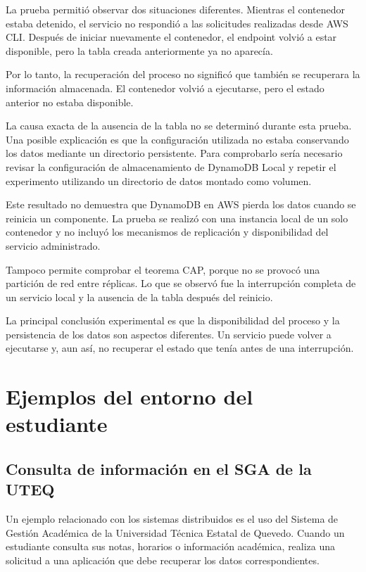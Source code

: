 \documentclass[12pt,a4paper]{article}
\begin{document}
La prueba permitió observar dos situaciones diferentes. Mientras el contenedor estaba detenido, el servicio no respondió a las solicitudes realizadas desde AWS CLI. Después de iniciar nuevamente el contenedor, el endpoint volvió a estar disponible, pero la tabla creada anteriormente ya no aparecía.

Por lo tanto, la recuperación del proceso no significó que también se recuperara la información almacenada. El contenedor volvió a ejecutarse, pero el estado anterior no estaba disponible.

La causa exacta de la ausencia de la tabla no se determinó durante esta prueba. Una posible explicación es que la configuración utilizada no estaba conservando los datos mediante un directorio persistente. Para comprobarlo sería necesario revisar la configuración de almacenamiento de DynamoDB Local y repetir el experimento utilizando un directorio de datos montado como volumen.

Este resultado no demuestra que DynamoDB en AWS pierda los datos cuando se reinicia un componente. La prueba se realizó con una instancia local de un solo contenedor y no incluyó los mecanismos de replicación y disponibilidad del servicio administrado.

Tampoco permite comprobar el teorema CAP, porque no se provocó una partición de red entre réplicas. Lo que se observó fue la interrupción completa de un servicio local y la ausencia de la tabla después del reinicio.

La principal conclusión experimental es que la disponibilidad del proceso y la persistencia de los datos son aspectos diferentes. Un servicio puede volver a ejecutarse y, aun así, no recuperar el estado que tenía antes de una interrupción.

\section{Ejemplos del entorno del estudiante}

\subsection{Consulta de información en el SGA de la UTEQ}

Un ejemplo relacionado con los sistemas distribuidos es el uso del Sistema de Gestión Académica de la Universidad Técnica Estatal de Quevedo. Cuando un estudiante consulta sus notas, horarios o información académica, realiza una solicitud a una aplicación que debe recuperar los datos correspondientes.
\end{document}
